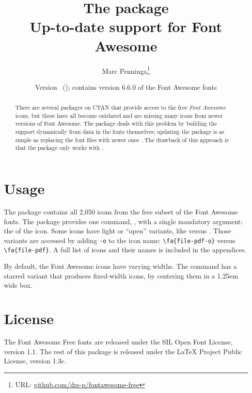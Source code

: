 \documentclass[10pt, a4paper]{ltxdoc}
\begin{document}
\title{The \textsf{\jobname} package\\Up-to-date  support for Font Awesome }
\author{Marc Penninga\thanks{URL: \href{https://github.com/drs-p/fontawesome-free}{ github.com/drs-p/fontawesome-free}}}
\makeatletter
\date{Version \fontawesome@free@version\ (\fontawesome@free@date); contains version 6.6.0 of the Font Awesome fonts}
\makeatother
\maketitle

\begin{abstract}
    There are several packages on CTAN that provide access to the free \emph{Font Awesome} icons, but these have all become outdated and are missing many icons from newer versions of Font Awesome.
    The \textsf{\jobname} package deals with this problem by building the  support dynamically from data in the fonts themselves; updating the package is as simple as replacing the font files with newer ones . The drawback of this approach is that the package only works with  .
\end{abstract}

\tableofcontents

\section{Usage}
The \textsf{\jobname} package contains all 2,050 icons from the free subset of the Font Awesome fonts. \DescribeMacro{\fa}The package provides one command, , with a single mandatory argument: the  of the icon. Some icons have light or ``open'' variants, like  versus . Those variants are accessed by adding \texttt{-o} to the icon name: \verb|\fa{file-pdf-o}| versus \verb|\fa{file-pdf}|. A full list of icons and their names is included in the appendices.

By default, the Font Awesome icons have varying widths. \DescribeMacro{\fa*}The  command has a starred variant  that produces fixed-width icons, by centering them in a 1.25em wide box.

\section*{License}
The Font Awesome Free fonts are released under the SIL Open Font License, version 1.1.
The rest of this package is released under the LaTeX Project Public License, version 1.3c.
\end{document}

